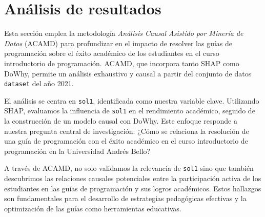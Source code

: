 \hypertarget{analisis_resultado}{%
    \section{Análisis de resultados}\label{Análisis de resultados}}

Esta sección emplea la metodología \textit{Análisis Causal Asistido por Minería de Datos} (ACAMD) para profundizar en el impacto de resolver las guías de programación sobre el éxito académico de los estudiantes en el curso introductorio de programación. ACAMD, que incorpora tanto SHAP como DoWhy, permite un análisis exhaustivo y causal a partir del conjunto de datos \texttt{dataset} del año 2021.

El análisis se centra en \texttt{sol1}, identificada como nuestra variable clave. Utilizando SHAP, evaluamos la influencia de \texttt{sol1} en el rendimiento académico, seguido de la construcción de un modelo causal con DoWhy. Este enfoque responde a nuestra pregunta central de investigación: ¿Cómo se relaciona la resolución de una guía de programación con el éxito académico en el curso introductorio de programación en la Universidad Andrés Bello?

A través de ACAMD, no solo validamos la relevancia de \texttt{sol1} sino que también descubrimos las relaciones causales potenciales entre la participación activa de los estudiantes en las guías de programación y sus logros académicos. Estos hallazgos son fundamentales para el desarrollo de estrategias pedagógicas efectivas y la optimización de las guías como herramientas educativas.









